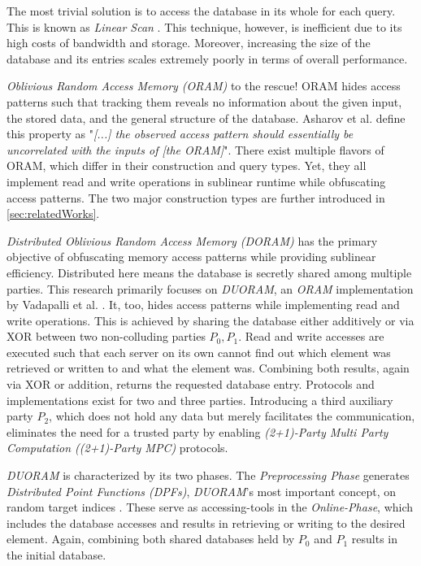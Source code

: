 The most trivial solution is to access the database in its whole for each query.
This is known as \textit{Linear Scan} \cite{doerner2017scale}.
This technique, however, is inefficient due to its high costs of bandwidth and storage.
Moreover, increasing the size of the database and its entries scales extremely poorly in terms of overall performance.

\textit{Oblivious Random Access Memory (ORAM)} to the rescue! 
ORAM hides access patterns such that tracking them reveals no information about the given input, the stored data, and the general structure of the database.
Asharov et al. \cite{asharov2022oopram} define this property as "\textit{[...] the observed access pattern should essentially be uncorrelated with the inputs of [the ORAM]}".
There exist multiple flavors of ORAM, which differ in their construction and query types.
Yet, they all implement read and write operations in sublinear runtime while obfuscating access patterns.
The two major construction types are further introduced in \ref{sec:relatedWorks}.

\textit{Distributed Oblivious Random Access Memory (DORAM)} has the primary objective of obfuscating memory access patterns \cite{vadapalli2023duoram} while providing sublinear efficiency.
Distributed here means the database is secretly shared among multiple parties.
This research primarily focuses on \textit{DUORAM}, an \textit{ORAM} implementation by Vadapalli et al. \cite{vadapalli2023duoram}.
It, too, hides access patterns while implementing read and write operations.
This is achieved by sharing the database either additively or via XOR between two non-colluding parties $P_0,P_1$. 
Read and write accesses are executed such that each server on its own cannot find out which element was retrieved or written to and what the element was.
Combining both results, again via XOR or addition, returns the requested database entry.
Protocols and implementations exist for two and three parties.
Introducing a third auxiliary party $P_2$, which does not hold any data but merely facilitates the communication, eliminates the need for a trusted party by enabling \textit{(2+1)-Party Multi Party Computation ((2+1)-Party MPC)} protocols.

\textit{DUORAM} is characterized by its two phases.
The \textit{Preprocessing Phase} generates \textit{Distributed Point Functions (DPFs)}, \textit{DUORAM}'s most important concept, on random target indices \cite{vadapalli2023duoram}.
These serve as accessing-tools in the \textit{Online-Phase}, which includes the database accesses and results in retrieving or writing to the desired element.
Again, combining both shared databases held by $P_0$ and $P_1$ results in the initial database.

